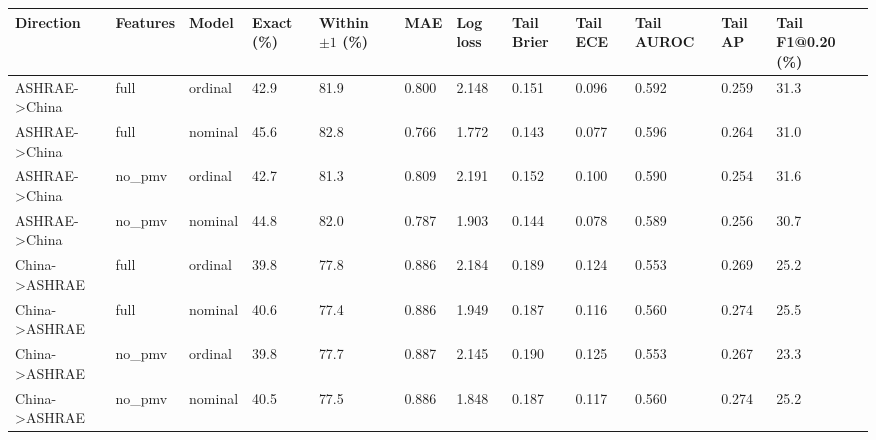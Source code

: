 \begin{tabular}{llllllllllll}
\toprule
Direction & Features & Model & Exact (\%) & Within $\pm1$ (\%) & MAE & Log loss & Tail Brier & Tail ECE & Tail AUROC & Tail AP & Tail F1@0.20 (\%) \\
\midrule
ASHRAE->China & full & ordinal & 42.9 & 81.9 & 0.800 & 2.148 & 0.151 & 0.096 & 0.592 & 0.259 & 31.3 \\
ASHRAE->China & full & nominal & 45.6 & 82.8 & 0.766 & 1.772 & 0.143 & 0.077 & 0.596 & 0.264 & 31.0 \\
ASHRAE->China & no_pmv & ordinal & 42.7 & 81.3 & 0.809 & 2.191 & 0.152 & 0.100 & 0.590 & 0.254 & 31.6 \\
ASHRAE->China & no_pmv & nominal & 44.8 & 82.0 & 0.787 & 1.903 & 0.144 & 0.078 & 0.589 & 0.256 & 30.7 \\
China->ASHRAE & full & ordinal & 39.8 & 77.8 & 0.886 & 2.184 & 0.189 & 0.124 & 0.553 & 0.269 & 25.2 \\
China->ASHRAE & full & nominal & 40.6 & 77.4 & 0.886 & 1.949 & 0.187 & 0.116 & 0.560 & 0.274 & 25.5 \\
China->ASHRAE & no_pmv & ordinal & 39.8 & 77.7 & 0.887 & 2.145 & 0.190 & 0.125 & 0.553 & 0.267 & 23.3 \\
China->ASHRAE & no_pmv & nominal & 40.5 & 77.5 & 0.886 & 1.848 & 0.187 & 0.117 & 0.560 & 0.274 & 25.2 \\
\bottomrule
\end{tabular}
